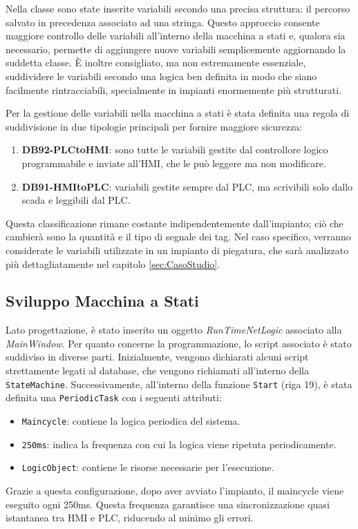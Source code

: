 Nella classe sono state inserite variabili secondo una precisa struttura: il percorso salvato in precedenza associato ad una stringa. Questo approccio consente maggiore controllo delle variabili all'interno della macchina a stati e, qualora sia necessario, permette di aggiungere nuove variabili semplicemente aggiornando la suddetta classe. È inoltre consigliato, ma non estremamente essenziale, suddividere le variabili secondo una logica ben definita in modo che siano facilmente rintracciabili, specialmente in impianti enormemente più strutturati.

Per la gestione delle variabili nella macchina a stati è stata definita una regola di suddivisione in due tipologie principali per fornire maggiore sicurezza:
\begin{enumerate}
    \item \textbf{DB92-PLCtoHMI}: sono tutte le variabili gestite dal controllore logico programmabile e inviate all'HMI, che le può leggere ma non modificare.
    \item \textbf{DB91-HMItoPLC}: variabili gestite sempre dal PLC, ma scrivibili solo dallo scada e leggibili dal PLC.
\end{enumerate}
Questa classificazione rimane costante indipendentemente dall'impianto; ciò che cambierà sono la quantità e il tipo di segnale dei tag. Nel caso specifico, verranno considerate le variabili utilizzate in un impianto di piegatura, che sarà analizzato più dettagliatamente nel capitolo \ref{sec:CasoStudio}. 

\subsection{Sviluppo Macchina a Stati}

 Lato progettazione, è stato inserito un oggetto \textit{RunTimeNetLogic} associato alla \textit{MainWindow}. Per quanto concerne la programmazione, lo script associato è stato suddiviso in diverse parti. Inizialmente, vengono dichiarati alcuni script strettamente legati al database, che vengono richiamati all'interno della \verb|StateMachine|. Successivamente, all'interno della funzione \verb|Start| (riga 19), è stata definita una \verb|PeriodicTask| con i seguenti attributi: 
 \begin{itemize}
     \item \verb|Maincycle|: contiene la logica periodica del sistema.
     \item \verb|250ms|: indica la frequenza con cui la logica viene ripetuta periodicamente. 
     \item \verb|LogicObject|: contiene le risorse necessarie per l'esecuzione.
 \end{itemize}
Grazie a questa configurazione, dopo aver avviato l'impianto, il maincycle viene eseguito ogni 250ms. Questa frequenza garantisce una sincronizzazione quasi istantanea tra HMI e PLC, riducendo al minimo gli errori.

